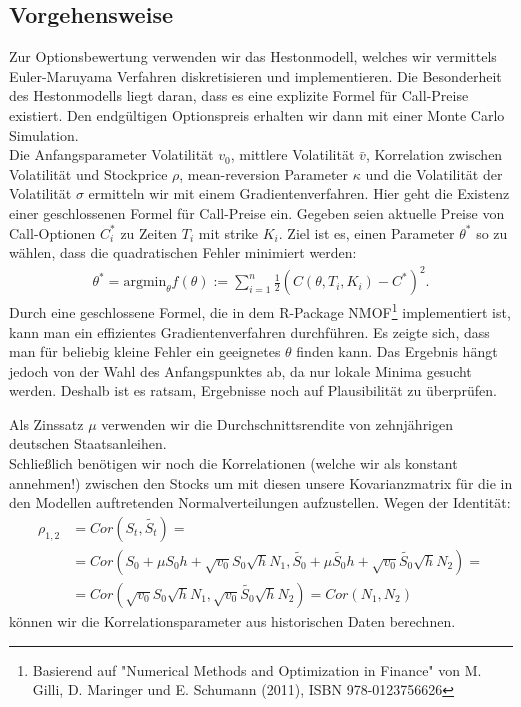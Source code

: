 \documentclass[12pt]{article}
\begin{document}
\subsection*{Vorgehensweise}
Zur Optionsbewertung verwenden wir das Hestonmodell, welches wir vermittels Euler-Maruyama Verfahren diskretisieren und implementieren. Die Besonderheit des Hestonmodells liegt daran, dass es eine explizite Formel für Call-Preise existiert. Den endgültigen Optionspreis erhalten wir dann mit einer Monte Carlo Simulation.\\
Die Anfangsparameter Volatilität $v_0$, mittlere Volatilität $\bar{v}$, Korrelation zwischen Volatilität und Stockprice $\rho$, mean-reversion Parameter $\kappa$ und die Volatilität der Volatilität $\sigma$ ermitteln wir mit einem Gradientenverfahren. Hier geht die Existenz einer geschlossenen Formel für Call-Preise ein. Gegeben seien aktuelle Preise von Call-Optionen $C_i^*$ zu Zeiten $T_i$ mit strike $K_i$. Ziel ist es, einen Parameter $\theta^*$ so zu wählen, dass die quadratischen Fehler minimiert werden:
\begin{gather*}
\theta^*=\text{argmin}_{\theta} f(\theta):=\sum_{i=1}^n \frac12 (C(\theta,T_i,K_i)-C^*)^2.
\end{gather*}
Durch eine geschlossene Formel, die in dem R-Package \glqq NMOF\grqq\footnote{Basierend auf "Numerical Methods and Optimization in Finance" von M. Gilli, D. Maringer und E. Schumann (2011), ISBN 978-0123756626} implementiert ist, kann man ein effizientes Gradientenverfahren durchführen. Es zeigte sich, dass man für beliebig kleine Fehler ein geeignetes $\theta$ finden kann. Das Ergebnis hängt jedoch von der Wahl des Anfangspunktes ab, da nur lokale Minima gesucht werden. Deshalb ist es ratsam, Ergebnisse noch auf Plausibilität zu überprüfen.


Als Zinssatz $\mu$ verwenden wir die Durchschnittsrendite von zehnjährigen deutschen Staatsanleihen.\\
Schließlich benötigen wir noch die Korrelationen (welche wir als konstant annehmen!) zwischen den Stocks um mit diesen unsere Kovarianzmatrix für die in den Modellen auftretenden Normalverteilungen aufzustellen.
Wegen der Identität:
\begin{align*}
\rho_{1,2}&=Cor(S_t,\tilde{S_t})=\\
&=Cor(S_0+\mu S_0h+\sqrt{v_0}S_0\sqrt{h}N_1,\tilde{S_0}+\mu \tilde{S_0}h+\sqrt{v_0}\tilde{S_0}\sqrt{h}N_2)= \\
&=Cor(\sqrt{v_0}S_0\sqrt{h}N_1,\sqrt{v_0}\tilde{S_0}\sqrt{h}N_2)=Cor(N_1,N_2)
\end{align*}
können wir die Korrelationsparameter aus historischen Daten berechnen.
\end{document}
